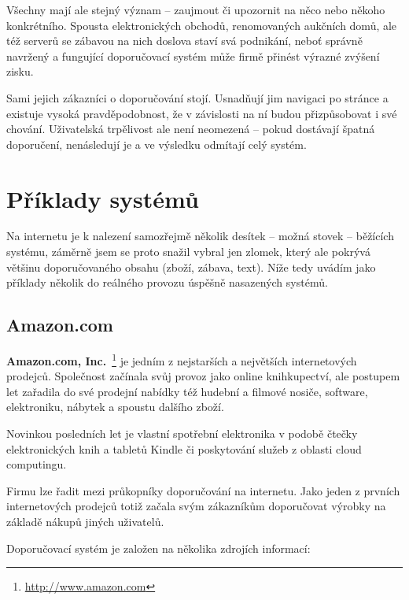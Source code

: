 \documentclass[thesis=M,czech]{FITthesis}[2014/05/07]
\begin{document}
Všechny mají ale stejný význam – zaujmout či upozornit na něco nebo někoho konkrétního. Spousta elektronických obchodů, renomovaných aukčních domů, ale též serverů se zábavou na nich doslova staví svá podnikání, neboť správně navržený a fungující doporučovací systém může firmě přinést výrazné zvýšení zisku. 

Sami jejich zákazníci o doporučování stojí. Usnadňují jim navigaci po stránce a existuje vysoká pravděpodobnost, že v závislosti na ní budou přizpůsobovat i své chování. Uživatelská trpělivost ale není neomezená – pokud dostávají špatná doporučení, nenásledují je a ve výsledku odmítají celý systém.

\section{Příklady systémů}
\label{sec:examples}
Na internetu je k nalezení samozřejmě několik desítek – možná stovek – běžících systému, záměrně jsem se proto snažil vybral jen zlomek, který ale pokrývá většinu doporučovaného obsahu (zboží, zábava, text). Níže tedy uvádím jako příklady několik do reálného provozu úspěšně nasazených systémů. 

\subsection{Amazon.com}

\textbf{Amazon.com, Inc.}~\footnote{\url{http://www.amazon.com}} je jedním z nejstarších a největších internetových prodejců. Společnost začínala svůj provoz jako online knihkupectví, ale postupem let zařadila do své prodejní nabídky též hudební a filmové nosiče, software, elektroniku, nábytek a spoustu dalšího zboží.

Novinkou posledních let je vlastní spotřební elektronika v podobě čtečky elektronických knih a tabletů Kindle či poskytování služeb z oblasti cloud computingu.

Firmu lze řadit mezi průkopníky doporučování na internetu. Jako jeden z prvních internetových prodejců totiž začala svým zákazníkům doporučovat výrobky na základě nákupů jiných uživatelů.

Doporučovací systém je založen na několika zdrojích informací:
\end{document}
